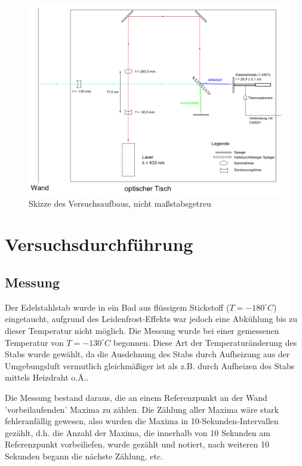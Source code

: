 \begin{landscape}
\begin{figure}
\includegraphics[height=\textwidth]{images/bitmap.png}
\caption{Skizze des Versuchsaufbaus, nicht maßstabsgetreu} 
\label{pic:skizze_versuchsaufbau}
\end{figure}
\end{landscape}

\section{Versuchsdurchführung}
\subsection{Messung}
Der Edelstahlstab wurde in ein Bad aus flüssigem Stickstoff ($T=-180^{\circ}C$) eingetaucht, aufgrund des Leidenfrost-Effekts war jedoch eine Abkühlung bis zu dieser Temperatur nicht möglich. Die Messung wurde bei einer gemessenen Temperatur von $T=-130^{\circ}C$ begonnen. Diese Art der Temperaturänderung des Stabs wurde gewählt, da die Ausdehnung des Stabs durch Aufheizung aus der Umgebungsluft vermutlich gleichmäßiger ist als z.B. durch Aufheizen des Stabs mittels Heizdraht o.Ä..

Die Messung bestand daraus, die an einem Referenzpunkt an der Wand 'vorbeilaufenden' Maxima zu zählen. Die Zählung aller Maxima wäre stark fehleranfällig gewesen, also wurden die Maxima in 10-Sekunden-Intervallen gezählt, d.h. die Anzahl der Maxima, die innerhalb von 10 Sekunden am Referenzpunkt vorbeiliefen, wurde gezählt und notiert, nach weiteren 10 Sekunden begann die nächste Zählung, etc. 

